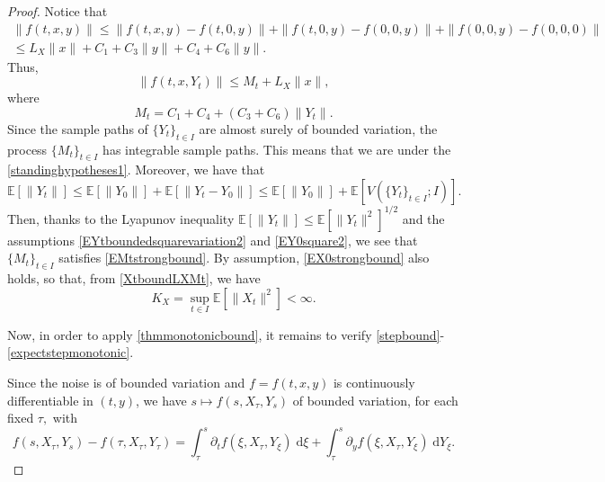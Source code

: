 \documentclass[reqno,12pt]{amsart}
\theoremstyle{plain} %
\theoremstyle{definition} %
\begin{document}
\begin{proof}
    Notice that
    \begin{multline*}
        \|f(t, x, y)\| \leq \|f(t, x, y) - f(t, 0, y)\| + \|f(t, 0, y) - f(0, 0, y)\| + \|f(0, 0, y) - f(0, 0, 0)\| \\
        \leq L_X \|x\| + C_1 + C_3\|y\| + C_4 + C_6\|y\|. 
    \end{multline*}
    Thus,
    \[
        \|f(t, x, Y_t)\| \leq M_t + L_X \|x\|,
    \]
    where
    \[
        M_t = C_1 + C_4 + (C_3 + C_6)\|Y_t\|.
    \]
    Since the sample paths of $\{Y_t\}_{t\in I}$ are almost surely of bounded variation, the process $\{M_t\}_{t\in I}$ has integrable sample paths. This means that we are under the \cref{standinghypotheses1}. Moreover, we have that
    \[
        \mathbb{E}[\|Y_t\|] \leq \mathbb{E}[\|Y_0\|] + \mathbb{E}[\|Y_t - Y_0\|] \leq \mathbb{E}[\|Y_0\|] + \mathbb{E}[V(\{Y_t\}_{t\in I}; I)].
    \]
    Then, thanks to the Lyapunov inequality $\mathbb{E}[\|Y_t\|] \leq \mathbb{E}[\|Y_t\|^2]^{1/2}$ and the assumptions \eqref{EYtboundedsquarevariation2} and \eqref{EY0square2}, we see that $\{M_t\}_{t\in I}$ satisfies \eqref{EMtstrongbound}. By assumption, \eqref{EX0strongbound} also holds, so that, from \eqref{XtboundLXMt}, we have
    \[
        K_X = \sup_{t\in I}\mathbb{E}[\|X_t\|^2] < \infty.
    \]

    Now, in order to apply \cref{thmmonotonicbound}, it remains to verify \eqref{stepbound}-\eqref{expectstepmonotonic}.

    Since the noise is of bounded variation and $f=f(t, x, y)$ is continuously differentiable in $(t, y)$, we have $s\mapsto f(s, X_\tau, Y_s)$ of bounded variation, for each fixed $\tau,$ with
    \[
        f(s, X_\tau, Y_s) - f(\tau, X_\tau, Y_\tau) = \int_\tau^s \partial_t f(\xi, X_\tau, Y_\xi) \;\mathrm{d}\xi + \int_\tau^s \partial_y f(\xi, X_\tau, Y_\xi) \;\mathrm{d} Y_\xi.
    \]


\end{proof}
\end{document}
